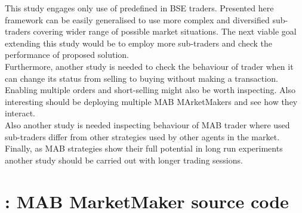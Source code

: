 \documentclass{llncs}
\begin{document}
This study engages only use of predefined in BSE traders. Presented here framework can be easily generalised to use more complex and diversified sub-traders covering wider range of possible market situations. The next viable goal extending this study would be to employ more sub-traders and check the performance of proposed solution.\\
Furthermore, another study is needed to check the behaviour of trader when it can change its status from selling to buying without making a transaction. Enabling multiple orders and short-selling might also be worth inspecting. Also interesting should be deploying multiple MAB MArketMakers and see how they interact.\\
Also another study is needed inspecting behaviour of MAB trader where used sub-traders differ from other strategies used by other agents in the market.\\
Finally, as MAB strategies show their full potential in long run experiments another study should be carried out with longer trading sessions.


\vfill



\newpage
\section*{\appendixname: MAB MarketMaker source code\label{app:MABmm}}


\end{document}
